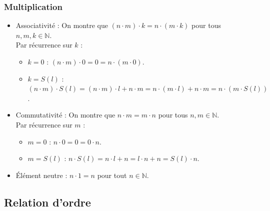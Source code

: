 \documentclass{article}
\begin{document}
\subsubsection{Multiplication}



\begin{itemize}
    \item Associativité : On montre que $(n \cdot m) \cdot k = n \cdot (m \cdot k)$ pour tous $n, m, k \in \mathbb{N}$.\\
    Par récurrence sur $k$ :
    \begin{itemize}
        \item $k = 0$ : $(n \cdot m) \cdot 0 = 0 = n \cdot (m \cdot 0)$.   
        \item $k = S(l)$ : $(n \cdot m) \cdot S(l) = (n \cdot m) \cdot l + n \cdot m = n \cdot (m \cdot l) + n \cdot m = n \cdot (m \cdot S(l))$.
    \end{itemize}
    \item Commutativité : On montre que $n \cdot m = m \cdot n$ pour tous $n, m \in \mathbb{N}$.\\
    Par récurrence sur $m$ :
    \begin{itemize}
        \item $m = 0$ : $n \cdot 0 = 0 = 0 \cdot n$.
        \item $m = S(l)$ : $n \cdot S(l) = n \cdot l + n = l \cdot n + n = S(l) \cdot n$.
    \end{itemize}
    \item Élément neutre : $n \cdot 1 = n$ pour tout $n \in \mathbb{N}$.
\end{itemize}

\subsection{Relation d'ordre}
\end{document}
